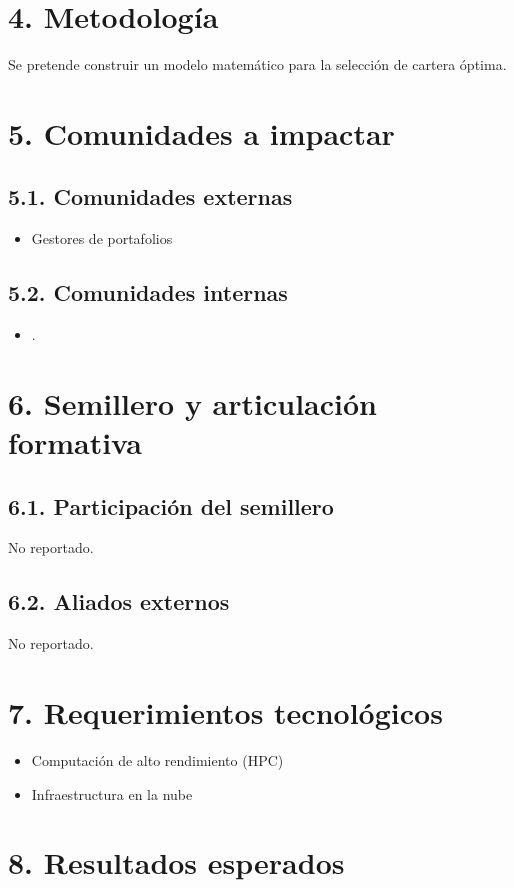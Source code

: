 \documentclass[a4paper,12pt]{article}
\begin{document}
\section*{4. Metodología}
Se pretende construir un modelo matemático para la selección de cartera óptima.

\section*{5. Comunidades a impactar}
\subsection*{5.1. Comunidades externas}
\begin{itemize}
    \item Gestores de portafolios
\end{itemize}

\subsection*{5.2. Comunidades internas}
\begin{itemize}
    \item .
\end{itemize}

\section*{6. Semillero y articulación formativa}
\subsection*{6.1. Participación del semillero}
No reportado.

\subsection*{6.2. Aliados externos}
No reportado.

\section*{7. Requerimientos tecnológicos}
\begin{itemize}
    \item Computación de alto rendimiento (HPC)
    \item Infraestructura en la nube
\end{itemize}

\section*{8. Resultados esperados}
\end{document}
